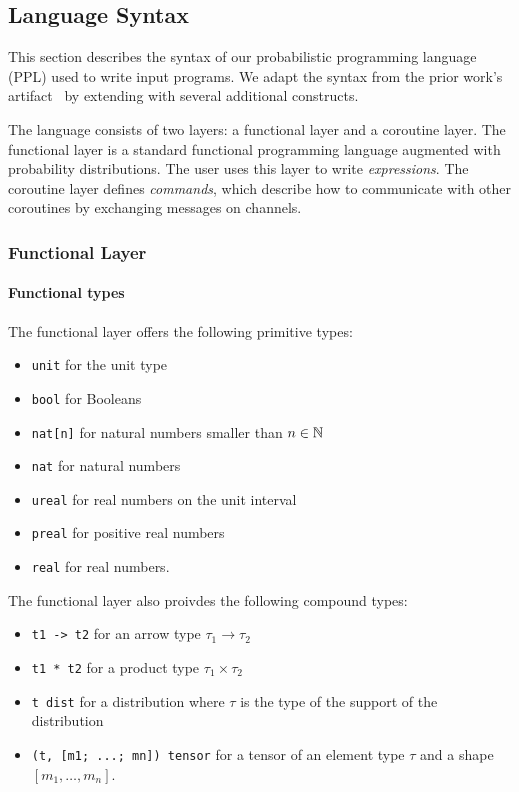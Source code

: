 \subsection{Language Syntax}

This section describes the syntax of our probabilistic programming language
(PPL) used to write input programs.
%
We adapt the syntax from the prior work's artifact~\citep{PLDI:WHR21B} by
extending with several additional constructs.

The language consists of two layers: a functional layer and a coroutine layer.
%
The functional layer is a standard functional programming language augmented
with probability distributions.
%
The user uses this layer to write \emph{expressions}.
%
The coroutine layer defines \emph{commands}, which describe how to communicate
with other coroutines by exchanging messages on channels.

\subsubsection{Functional Layer}

\paragraph{Functional types}

The functional layer offers the following primitive types:
\begin{itemize}
  \item \texttt{unit} for the unit type
  \item \texttt{bool} for Booleans
  \item \texttt{nat[n]} for natural numbers smaller than $n \in \mathbb{N}$
  \item \texttt{nat} for natural numbers
  \item \texttt{ureal} for real numbers on the unit interval
  \item \texttt{preal} for positive real numbers
  \item \texttt{real} for real numbers.
\end{itemize}
%
The functional layer also proivdes the following compound types:
\begin{itemize}
  \item \texttt{t1 -> t2} for an arrow type $\tau_1 \to \tau_2$
  \item \texttt{t1 * t2} for a product type $\tau_1 \times \tau_2$
  \item \texttt{t dist} for a distribution where $\tau$ is the type of the
        support of the distribution
  \item \texttt{(t, [m1; ...; mn]) tensor} for a tensor of an element type
        $\tau$ and a shape $[m_1, \ldots, m_n]$.
\end{itemize}

